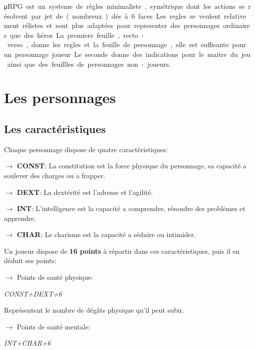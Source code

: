 ﻿\begin{landscape}
\begin{multicols}{4}


\date{} %
\maketitle{}


\si\micro RPG est un systeme de règles minimaliste, symétrique dont les actions se résolvent par jet de (nombreux) dés à 6 faces.
Les regles se veulent relativement rélistes et sont plus adaptées pour representer des personnages ordinaires que des héros.

La premiere feuille, recto-verso, donne les regles et la feuille de personnage, elle est suffisante pour un personnage joueur.
Le seconde donne des indications pour le maitre du jeu ainsi que des feuillles de personnages non-joueurs.

\section{Les personnages} 


\subsection{Les caractéristiques}

Chaque personnage dispose de quatre caractéristiques:


$\rightarrow$ \textbf{CONST}: La constitution est la force physique du personnage, sa capacité a soulever des charges ou a frapper.

$\rightarrow$ \textbf{DEXT}: La dextérité  est l'adresse et l'agilité.

$\rightarrow$ \textbf{INT}: L'intelligence est la capacité a comprendre, résoudre des problèmes et apprendre.

$\rightarrow$ \textbf{CHAR}: Le charisme est la capacité a séduire ou intimider.


Un joueur dispose de \textbf{16 points} à répartir dans ces caractéristiques, puis il en déduit ses points:


$\rightarrow$ Points de santé physique:

\textit{CONST+DEXT+6}

Représentent le nombre de dégâts physique qu'il peut subir.


$\rightarrow$ Points de santé mentale:

\textit{INT+CHAR+6}


\end{multicols}
\end{landscape}
